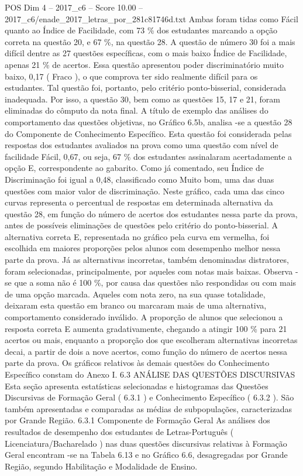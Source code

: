 \begin{textsample}{POS Dim 4 – 2017\_c6 – Score 10.00 – 2017\_c6/enade\_2017\_letras\_por\_281c81746d.txt}
Ambas foram tidas como Fácil quanto ao Índice de Facilidade, com 73 \% dos estudantes marcando a opção correta na questão 20, e 67 \%, na questão 28.
A questão de número 30 foi a mais difícil dentre as 27 questões específicas, com o mais baixo Índice de Facilidade, apenas 21 \% de acertos.
Essa questão apresentou poder discriminatório muito baixo, 0,17 ( Fraco ), o que comprova ter sido realmente difícil para os estudantes.
Tal questão foi, portanto, pelo critério ponto-bisserial, considerada inadequada.
Por isso, a questão 30, bem como as questões 15, 17 e 21, foram eliminadas do cômputo da nota final.
A título de exemplo das análises do comportamento das questões objetivas, no Gráfico 6.5b, analisa -se a questão 28 do Componente de Conhecimento Específico.
Esta questão foi considerada pelas respostas dos estudantes avaliados na prova como uma questão com nível de facilidade Fácil, 0,67, ou seja, 67 \% dos estudantes assinalaram acertadamente a opção E, correspondente ao gabarito.
Como já comentado, seu Índice de Discriminação foi igual a 0,48, classificado como Muito bom, uma das duas questões com maior valor de discriminação.
Neste gráfico, cada uma das cinco curvas representa o percentual de respostas em determinada alternativa da questão 28, em função do número de acertos dos estudantes nessa parte da prova, antes de possíveis eliminações de questões pelo critério do ponto-bisserial.
A alternativa correta E, representada no gráfico pela curva em vermelha, foi escolhida em maiores proporções pelos alunos com desempenho melhor nessa parte da prova.
Já as alternativas incorretas, também denominadas distratores, foram selecionadas, principalmente, por aqueles com notas mais baixas.
Observa -se que a soma não é 100 \%, por causa das questões não respondidas ou com mais de uma opção marcada.
Aqueles com nota zero, na sua quase totalidade, deixaram esta questão em branco ou marcaram mais de uma alternativa, comportamento considerado inválido.
A proporção de alunos que selecionou a resposta correta E aumenta gradativamente, chegando a atingir 100 \% para 21 acertos ou mais, enquanto a proporção dos que escolheram alternativas incorretas decai, a partir de dois a nove acertos, como função do número de acertos nessa parte da prova.
Os gráficos relativos às demais questões do Conhecimento Específico constam do Anexo I. 6.3 ANÁLISE DAS QUESTÕES DISCURSIVAS Esta seção apresenta estatísticas selecionadas e histogramas das Questões Discursivas de Formação Geral ( 6.3.1 ) e Conhecimento Específico ( 6.3.2 ).
São também apresentadas e comparadas as médias de subpopulações, caracterizadas por Grande Região. 6.3.1 Componente de Formação Geral As análises dos resultados de desempenho dos estudantes de Letras-Português ( Licenciatura/Bacharelado ) nas duas questões discursivas relativas à Formação Geral encontram -se na Tabela 6.13 e no Gráfico 6.6, desagregadas por Grande Região, segundo Habilitação e Modalidade de Ensino.

\end{textsample}

